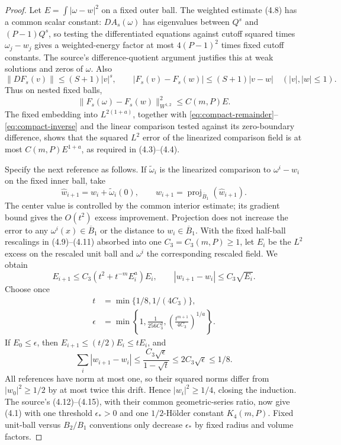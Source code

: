 \begin{proof}
Let $E=\int|\omega-w|^2$ on a fixed outer ball. The weighted
estimate (4.8) has a common scalar constant: $DA_s(\omega)$ has
eigenvalues between $Q^s$ and $(P-1)Q^s$, so testing the
differentiated equations against cutoff squared times
$\omega_j-w_j$ gives a weighted-energy factor at most
$4(P-1)^2$ times fixed cutoff constants. The source's
difference-quotient argument justifies this at weak solutions and
zeros of $\omega$. Also
\[
 \|DF_s(v)\|\leq(S+1)|v|^s,\qquad
 |F_s(v)-F_s(w)|\leq(S+1)|v-w|
 \quad (|v|,|w|\leq1).
\]
Thus on nested fixed balls,
\[
 \|F_s(\omega)-F_s(w)\|_{W^{1,2}}^2\leq C(m,P)E.
\]
The fixed embedding into $L^{2(1+a)}$, together with
\eqref{eq:compact-remainder}--\eqref{eq:compact-inverse} and the
linear comparison tested against its zero-boundary difference,
shows that the squared $L^2$ error of the linearized comparison
field is at most $C(m,P)E^{1+a}$, as required in (4.3)--(4.4).

Specify the next reference as follows. If $\widetilde\omega_i$ is
the linearized comparison to $\omega^i-w_i$ on the fixed inner
ball, take
\[
 \widehat w_{i+1}=w_i+\widetilde\omega_i(0),\qquad
 w_{i+1}=\operatorname{proj}_{\overline B_1}(\widehat w_{i+1}).
\]
The center value is controlled by the common interior estimate;
its gradient bound gives the $O(t^2)$ excess improvement. Projection
does not increase the error to any $\omega^i(x)\in\overline B_1$
or the distance to $w_i\in\overline B_1$. With the fixed half-ball
rescalings in (4.9)--(4.11) absorbed into one $C_3=C_3(m,P)\geq1$,
let $E_i$ be the $L^2$ excess on the rescaled unit ball and
$\omega^i$ the corresponding rescaled field. We obtain
\begin{equation}\label{eq:compact-iteration}
 E_{i+1}\leq C_3(t^2+t^{-m}E_i^a)E_i,\qquad
 |w_{i+1}-w_i|\leq C_3\sqrt{E_i}.
\end{equation}
Choose once
\begin{equation}\label{eq:compact-choices}
 \begin{split}
 t&=\min\{1/8,1/(4C_3)\},\\
 \epsilon&=\min\left\{1,\frac1{256C_3^2},
              \left(\frac{t^{m+1}}{4C_3}\right)^{1/a}\right\}.
 \end{split}
\end{equation}
If $E_0\leq\epsilon$, then $E_{i+1}\leq(t/2)E_i\leq tE_i$,
and
\[
 \sum_i|w_{i+1}-w_i|
 \leq\frac{C_3\sqrt\epsilon}{1-\sqrt t}
 \leq2C_3\sqrt\epsilon\leq1/8.
\]
All references have norm at most one, so their squared norms differ
from $|w_0|^2\geq1/2$ by at most twice this drift. Hence
$|w_i|^2\geq1/4$, closing the induction. The source's
(4.12)--(4.15), with their common geometric-series ratio, now give
(4.1) with one threshold $\epsilon_*>0$ and one $1/2$-H\"older
constant $K_4(m,P)$. Fixed unit-ball versus $B_2/B_1$ conventions
only decrease $\epsilon_*$ by fixed radius and volume factors.


\end{proof}
